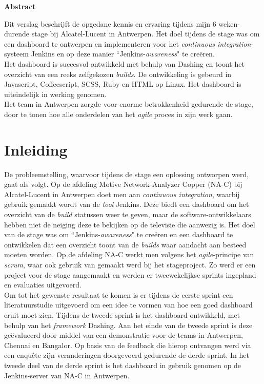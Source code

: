 \documentclass[10pt,a4paper]{article}
\begin{document}
\begin{center}
\textbf{Abstract}\\
\end{center}
Dit verslag beschrijft de opgedane kennis en ervaring tijdens mijn  6 weken-durende stage bij Alcatel-Lucent in Antwerpen. Het doel tijdens de stage was om een dashboard te ontwerpen en implementeren voor het \textit{continuous integration}-systeem Jenkins en op deze manier ``Jenkins-\textit{awareness}" te cre\"eren.\\
Het dashboard is succesvol ontwikkeld met behulp van Dashing en toont het overzicht van een reeks zelfgekozen \textit{builds}. De ontwikkeling is gebeurd in Javascript, Coffeescript, SCSS, Ruby en HTML op Linux. Het dashboard is uiteindelijk in werking genomen.\\
Het team in Antwerpen zorgde voor enorme betrokkenheid gedurende de stage, door te tonen hoe alle onderdelen van het \textit{agile} proces in zijn werk gaan. 

\tableofcontents
\clearpage

\section{Inleiding}
De probleemstelling, waarvoor tijdens de stage een oplossing ontworpen werd, gaat als volgt. Op de afdeling Motive Network-Analyzer Copper (NA-C) bij Alcatel-Lucent in Antwerpen doet men aan \textit{continuous integration}, waarbij gebruik gemaakt wordt van de \textit{tool} Jenkins. Deze biedt een dashboard om het overzicht van de \textit{build} statussen weer te geven, maar de software-ontwikkelaars hebben niet de neiging deze te bekijken op de televisie die aanwezig is. Het doel van de stage was om ``Jenkins-\textit{awareness}" te cre\"eren en een dashboard te ontwikkelen dat een overzicht toont van de \textit{builds} waar aandacht aan besteed moeten worden. Op de afdeling NA-C werkt men volgens het \textit{agile}-principe van \textit{scrum}, waar ook gebruik van gemaakt werd bij het stageproject. Zo werd er een project voor de stage aangemaakt en werden er tweewekelijkse sprints ingepland en evaluaties uitgevoerd.\\

Om tot het gewenste resultaat te komen is er tijdens de eerste sprint een literatuurstudie uitgevoerd om een idee te vormen van hoe een goed dashboard eruit moet zien. Tijdens de tweede sprint is het dashboard ontwikkeld, met behulp van het \textit{framework} Dashing. Aan het einde van de tweede sprint is deze ge\"evalueerd door middel van een demonstratie voor de teams in Antwerpen, Chennai en Bangalor. Op basis van de feedback die hierop ontvangen werd via een enqu\^ete zijn veranderingen doorgevoerd gedurende de derde sprint. In het tweede deel van de derde sprint is het dashboard in gebruik genomen op de Jenkins-server van NA-C in Antwerpen.\\
\end{document}
